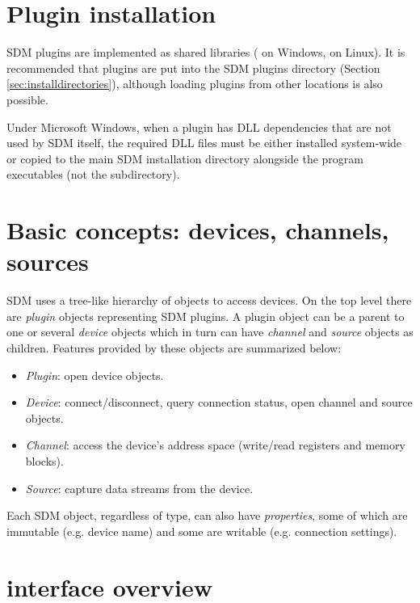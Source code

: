 \documentclass[a4paper,12pt,twoside,extrafontsizes]{memoir}
\begin{document}
\section{Plugin installation}

SDM plugins are implemented as shared libraries ( on Windows,  on Linux). It is recommended that plugins are put into the SDM plugins directory (Section \ref{sec:installdirectories}), although loading plugins from other locations is also possible.

Under Microsoft Windows, when a plugin has DLL dependencies that are not used by SDM itself, the required DLL files must be either installed system-wide or copied to the main SDM installation directory alongside the program executables (not the  subdirectory).

\section{Basic concepts: devices, channels, sources}

SDM uses a tree-like hierarchy of objects to access devices. On the top level there are \emph{plugin} objects representing SDM plugins. A plugin object can be a parent to one or several \emph{device} objects which in turn can have \emph{channel} and \emph{source} objects as children. Features provided by these objects are summarized below:

\begin{itemize}
	\item \emph{Plugin}: open device objects.
	\item \emph{Device}: connect/disconnect, query connection status, open channel and source objects.
	\item \emph{Channel}: access the device's address space (write/read registers and memory blocks).
	\item \emph{Source}: capture data streams from the device.
\end{itemize}

Each SDM object, regardless of type, can also have \emph{properties}, some of which are immutable (e.g. device name) and some are writable (e.g. connection settings).

\section[sdmconsole interface overview]{ interface overview}
\end{document}
